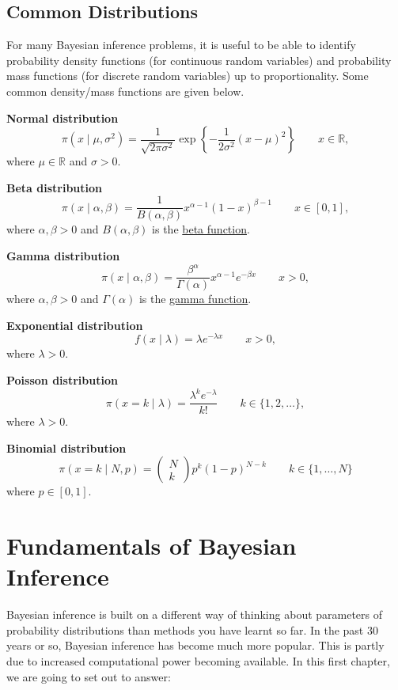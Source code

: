 \documentclass[
]{book}
\theoremstyle{definition}
\theoremstyle{definition}
\theoremstyle{definition}
\theoremstyle{definition}
\theoremstyle{remark}
\begin{document}
\hypertarget{common-distributions}{%
\section{Common Distributions}\label{common-distributions}}

For many Bayesian inference problems, it is useful to be able to
identify probability density functions (for continuous random variables)
and probability mass functions (for discrete random variables) up to
proportionality. Some common density/mass functions are given below.

\textbf{Normal distribution} \[
\pi(x \mid \mu, \sigma^2) = \frac{1}{\sqrt{2\pi\sigma^2}}\exp\left\{-\frac{1}{2\sigma^2}(x-\mu)^2\right\} \qquad x \in\mathbb{R},
\] where \(\mu \in \mathbb{R}\) and \(\sigma > 0\).

\textbf{Beta distribution} \[
\pi(x\mid \alpha, \beta) = \frac{1}{B(\alpha, \beta)}x^{\alpha-1}(1-x)^{\beta - 1} \qquad  x \in [0, 1],
\] where \(\alpha, \beta > 0\) and \(B(\alpha, \beta)\) is the \href{https://en.wikipedia.org/wiki/Beta_function}{beta
function}.

\textbf{Gamma distribution} \[
\pi(x\mid \alpha, \beta) = \frac{\beta^\alpha}{\Gamma(\alpha)}x^{\alpha - 1}e^{-\beta x} \qquad  x > 0,
\] where \(\alpha, \beta > 0\) and \(\Gamma(\alpha)\) is the \href{https://en.wikipedia.org/wiki/Gamma_function}{gamma
function}.

\textbf{Exponential distribution} \[
f(x \mid \lambda) = \lambda e^{-\lambda x} \qquad x > 0,
\] where \(\lambda > 0\).

\textbf{Poisson distribution} \[
\pi(x = k \mid \lambda) = \frac{\lambda^k e^{-\lambda}}{k!} \qquad k \in \{1, 2, \ldots\},
\] where \(\lambda > 0\).

\textbf{Binomial distribution} \[
\pi(x = k \mid N, p) = \begin{pmatrix} N \\ k\end{pmatrix} p^k (1-p)^{N-k} \qquad k \in \{1, \ldots, N\}
\] where \(p \in [0, 1]\).

\hypertarget{fundamentals}{%
\chapter{Fundamentals of Bayesian Inference}\label{fundamentals}}

Bayesian inference is built on a different way of thinking about parameters of probability distributions than methods you have learnt so far. In the past 30 years or so, Bayesian inference has become much more popular. This is partly due to increased computational power becoming available. In this first chapter, we are going to set out to answer:
\end{document}
